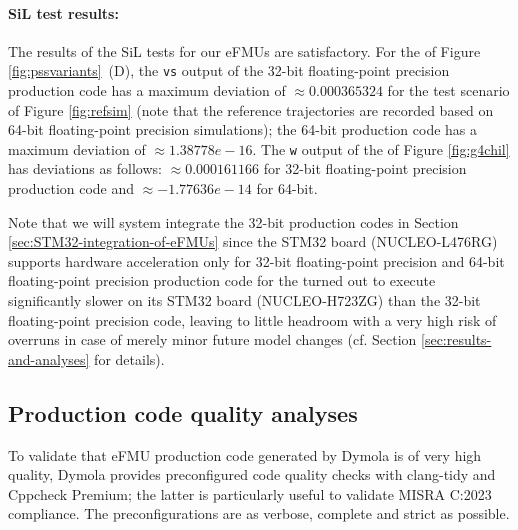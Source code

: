\paragraph{SiL test results:} The results of the SiL tests for our eFMUs are satisfactory. For the \controller{} of Figure \ref{fig:pssvariants}~(D), the \texttt{vs} output of the 32-bit floating-point precision production code has a maximum deviation of ${\approx}0.000365324$ for the test scenario of Figure \ref{fig:refsim} (note that the reference trajectories are recorded based on 64-bit floating-point precision simulations); the 64-bit production code has a maximum deviation of ${\approx}1.38778e-16$. The \texttt{w} output of the \plant{} of Figure \ref{fig:g4chil} has deviations as follows: ${\approx}0.000161166$ for 32-bit floating-point precision production code and ${\approx}-1.77636e-14$ for 64-bit.

Note that we will system integrate the 32-bit production codes in Section \ref{sec:STM32-integration-of-eFMUs} since the \controller{} STM32 board (NUCLEO-L476RG) supports hardware acceleration only for 32-bit floating-point precision and 64-bit floating-point precision production code for the \plant{} turned out to execute significantly slower on its STM32 board (NUCLEO-H723ZG) than the 32-bit floating-point precision code, leaving to little headroom with a very high risk of overruns in case of merely minor future model changes (cf. Section \ref{sec:results-and-analyses} for details).

\subsection{Production code quality analyses}\label{sec:production-code-quality-analyses}

To validate that eFMU production code generated by Dymola is of very high quality, Dymola provides preconfigured code quality checks with clang-tidy and Cppcheck Premium; the latter is particularly useful to validate MISRA C:2023 compliance. The preconfigurations are as verbose, complete and strict as possible.

